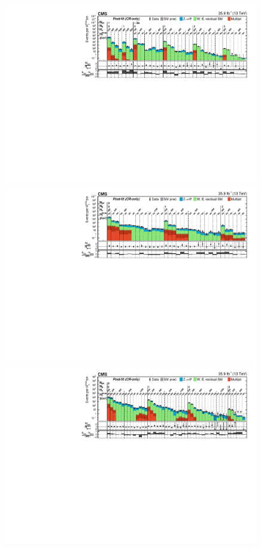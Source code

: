 \begin{figure}[!p]
  \centering
  \includegraphics[width=0.99\textwidth]{CMS-SUS-16-038_Figure_001-a.pdf}\\
  \includegraphics[width=0.99\textwidth]{CMS-SUS-16-038_Figure_001-b.pdf}\\
  \includegraphics[width=0.99\textwidth]{CMS-SUS-16-038_Figure_001-c.pdf}\\

\end{figure}
